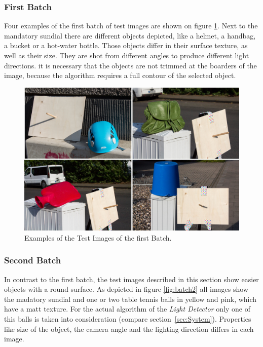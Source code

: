 \subsubsection{First Batch} \label{sec:testimagesfirst}
Four examples of the first batch of test images are shown on figure \ref{fig:batch1}. Next to the mandatory sundial there are different objects depicted, like a helmet, a handbag, a bucket or a hot-water bottle. Those objects differ in their surface texture, as well as their size. They are shot from different angles to produce different light directions. it is necessary that the objects are not trimmed at the boarders of the image, because the algorithm requires a full contour of the selected object.


\begin{figure}[H] 
	\center 
	\includegraphics[width=12cm]{Images/batch1.jpg}			
	\caption[Examples of the Test Images of the first Batch.]{Examples of the Test Images of the first Batch.}
	\label{fig:batch1}
\end{figure}

\subsubsection{Second Batch} \label{sec:testimagessecond}
In contrast to the first batch, the test images described in this section show easier objects with a round surface. As depicted in figure \ref{fig:batch2} all images show the madatory sundial and one or two table tennis balls in yellow and pink, which have a matt texture. For the actual algorithm of the \textit{Light Detector} only one of this balls is taken into consideration (compare section~\ref{sec:System}). Properties like size of the object, the camera angle and the lighting direction differs in each image.

